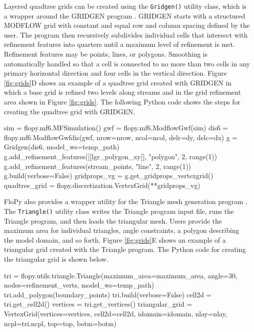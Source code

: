 \documentclass[12pt, oneside]{article}  	%
\begin{document}
Layered quadtree grids can be created using the \texttt{Gridgen()} utility class, which is a wrapper around the GRIDGEN program \citep{gridgen}. GRIDGEN starts with a structured MODFLOW grid with constant and equal row and column spacing defined by the user. The program then recursively subdivides individual cells that intersect with refinement features into quarters until a maximum level of refinement is met. Refinement features may be points, lines, or polygons. Smoothing is automatically handled so that a cell is connected to no more than two cells in any primary horizontal direction and four cells in the vertical direction. Figure \ref{fig:grids}D shows an example of a quadtree grid created with GRIDGEN in which a base grid is refined two levels along streams and in the grid refinement area shown in Figure \ref{fig:grids}. The following Python code shows the steps for creating the quadtree grid with GRIDGEN.

\begin{python}
sim = flopy.mf6.MFSimulation()
gwf = flopy.mf6.ModflowGwf(sim)
dis6 = flopy.mf6.ModflowGwfdis(gwf, nrow=nrow, ncol=ncol, delr=dy, delc=dx)
g = Gridgen(dis6, model_ws=temp_path)
g.add_refinement_features([[lgr_polygon_xy]], "polygon", 2, range(1))
g.add_refinement_features(stream_points, "line", 2, range(1))
g.build(verbose=False)
gridprops_vg = g.get_gridprops_vertexgrid()
quadtree_grid = flopy.discretization.VertexGrid(**gridprops_vg)
\end{python}

FloPy also provides a wrapper utility for the Triangle mesh generation program \citep{trianglemesh}. The \texttt{Triangle()} utility class writes the Triangle program input file, runs the Triangle program, and then loads the triangular mesh. Users provide the maximum area for individual triangles, angle constraints, a polygon describing the model domain, and so forth. Figure \ref{fig:grids}E shows an example of a triangular grid created with the Triangle program. The Python code for creating the triangular grid is shown below.

\begin{python}
tri = flopy.utils.triangle.Triangle(maximum_area=maximum_area, 
                                    angle=30, nodes=refinement_verts,
                                    model_ws=temp_path)
tri.add_polygon(boundary_points)
tri.build(verbose=False)
cell2d = tri.get_cell2d()
vertices = tri.get_vertices()
triangular_grid = VertexGrid(vertices=vertices, cell2d=cell2d, 
                             idomain=idomain, nlay=nlay, ncpl=tri.ncpl, 
                             top=top, botm=botm)
\end{python}
\end{document}
